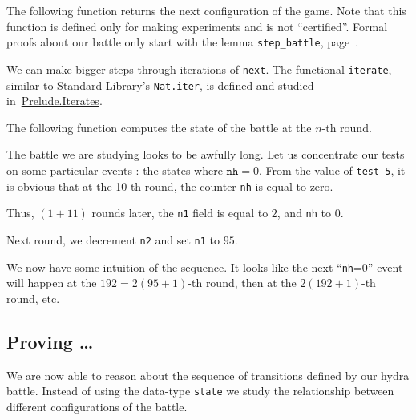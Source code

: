 



The following function returns the next configuration of the game.
Note that this function is defined only for making experiments and is not  ``certified''.  Formal proofs about our battle only start with the lemma
\texttt{step\_battle}, page~\pageref{lemma:step-battle}.





We can make bigger steps through iterations of \texttt{next}.
The functional \texttt{iterate}, similar to Standard Library's \texttt{Nat.iter},
is defined and studied in~\href{../theories/html/hydras.Prelude.Iterates.html\#iterate}{Prelude.Iterates}.

\label{Functions:iterate}




The following function computes the state of the battle at the $n$-th round.



The battle we are studying looks to be awfully long. Let us concentrate our
tests on some particular events : the states where $\texttt{nh}=0$.
From the value of \texttt{test 5},  it is obvious that at the 10-th round, the counter \texttt{nh} is equal to zero.




Thus, $(1 + 11)$ rounds later, the \texttt{n1} field is equal to $2$, and 
\texttt{nh}   to $0$. 





Next round, we decrement \texttt{n2} and set \texttt{n1} to $95$.





We now have some intuition of the sequence.
It looks like the next ``\texttt{nh}=0'' event will happen at the $192=2(95+1)$-th round, then at the $2(192+1)$-th round, etc.




\subsection{Proving \dots}
We are now able to reason about the sequence of transitions defined by our hydra battle. Instead of using the data-type \texttt{state} we study the relationship
between different configurations of the battle.

